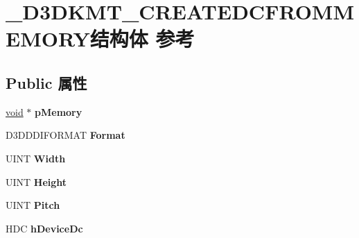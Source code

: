 \hypertarget{struct___d3_d_k_m_t___c_r_e_a_t_e_d_c_f_r_o_m_m_e_m_o_r_y}{}\section{\+\_\+\+D3\+D\+K\+M\+T\+\_\+\+C\+R\+E\+A\+T\+E\+D\+C\+F\+R\+O\+M\+M\+E\+M\+O\+R\+Y结构体 参考}
\label{struct___d3_d_k_m_t___c_r_e_a_t_e_d_c_f_r_o_m_m_e_m_o_r_y}
\subsection*{Public 属性}
\begin{DoxyCompactItemize}
\item 
\mbox{\label{struct___d3_d_k_m_t___c_r_e_a_t_e_d_c_f_r_o_m_m_e_m_o_r_y_aa8cb051a615b0ec735808068410c3494}} 
\hyperlink{interfacevoid}{void} $\ast$ {\bfseries p\+Memory}
\item 
\mbox{\label{struct___d3_d_k_m_t___c_r_e_a_t_e_d_c_f_r_o_m_m_e_m_o_r_y_a3835d3eb612db6be859d4a50af3161be}} 
D3\+D\+D\+D\+I\+F\+O\+R\+M\+AT {\bfseries Format}
\item 
\mbox{\label{struct___d3_d_k_m_t___c_r_e_a_t_e_d_c_f_r_o_m_m_e_m_o_r_y_aa30c63d4c7fff3746918face1a1b85e0}} 
U\+I\+NT {\bfseries Width}
\item 
\mbox{\label{struct___d3_d_k_m_t___c_r_e_a_t_e_d_c_f_r_o_m_m_e_m_o_r_y_ac98ff94da7b52279855a86b18b5dde66}} 
U\+I\+NT {\bfseries Height}
\item 
\mbox{\label{struct___d3_d_k_m_t___c_r_e_a_t_e_d_c_f_r_o_m_m_e_m_o_r_y_af500c42d07ebc6d905e7644dc0f6490f}} 
U\+I\+NT {\bfseries Pitch}
\item 
\mbox{\label{struct___d3_d_k_m_t___c_r_e_a_t_e_d_c_f_r_o_m_m_e_m_o_r_y_a69e252bad0f07ad2ca40a2c11e49fa99}} 
H\+DC {\bfseries h\+Device\+Dc}

\end{DoxyCompactItemize}
